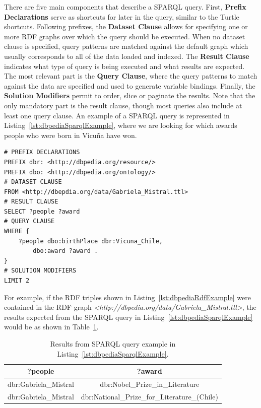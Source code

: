There are five main components that describe a SPARQL query. First, \textbf{Prefix Declarations} 
serve as shortcuts for later in the query, similar to the Turtle shortcuts. Following prefixes, 
the \textbf{Dataset Clause} allows for specifying one or more RDF graphs over which the query 
should be executed. When no dataset clause is specified, query patterns are matched against the 
default graph which usually corresponds to all of the data loaded and indexed. The 
\textbf{Result Clause} indicates what type of query is being executed and what results are expected. 
The most relevant part is the \textbf{Query Clause}, where the query patterns to match against the 
data are specified and used to generate variable bindings. Finally, the \textbf{Solution Modifiers} 
permit to order, slice or paginate the results. Note that the only mandatory part is the result 
clause, though most queries also include at least one query clause. An example of a SPARQL query is 
represented in Listing~\ref{lst:dbpediaSparqlExample}, where we are looking for which awards 
people who were born in Vicuña have won.

\begin{lstlisting}[captionpos=b, 
    caption=Set of RDF abbreviated triples about Gabriela Mistral in DBpedia., 
    label=lst:dbpediaSparqlExample,
    basicstyle=\ttfamily,frame=single]
# PREFIX DECLARATIONS
PREFIX dbr: <http://dbpedia.org/resource/>
PREFIX dbo: <http://dbpedia.org/ontology/>
# DATASET CLAUSE
FROM <http://dbepdia.org/data/Gabriela_Mistral.ttl>
# RESULT CLAUSE
SELECT ?people ?award
# QUERY CLAUSE
WHERE {
    ?people dbo:birthPlace dbr:Vicuna_Chile,
        dbo:award ?award .
}
# SOLUTION MODIFIERS
LIMIT 2
\end{lstlisting}

For example, if the RDF triples shown in Listing~\ref{lst:dbpediaRdfExample} were contained in the 
RDF graph \textit{<http://dbpedia.org/data/Gabriela\_Mistral.ttl>}, the results 
expected from the SPARQL query in Listing~\ref{lst:dbpediaSparqlExample} would be as shown 
in Table~\ref{table:dbpediaExampleResults}.

\begin{table}[h!]
    \centering
    \begin{tabular}{ |c|c| }        
        \hline
        ?people & ?award \\ 
        \hline
        dbr:Gabriela\_Mistral & dbr:Nobel\_Prize\_in\_Literature \\
        dbr:Gabriela\_Mistral & dbr:National\_Prize\_for\_Literature\_(Chile) \\
        \hline
    \end{tabular}
    \caption{Results from SPARQL query example in Listing~\ref{lst:dbpediaSparqlExample}.}
    \label{table:dbpediaExampleResults}
\end{table}

